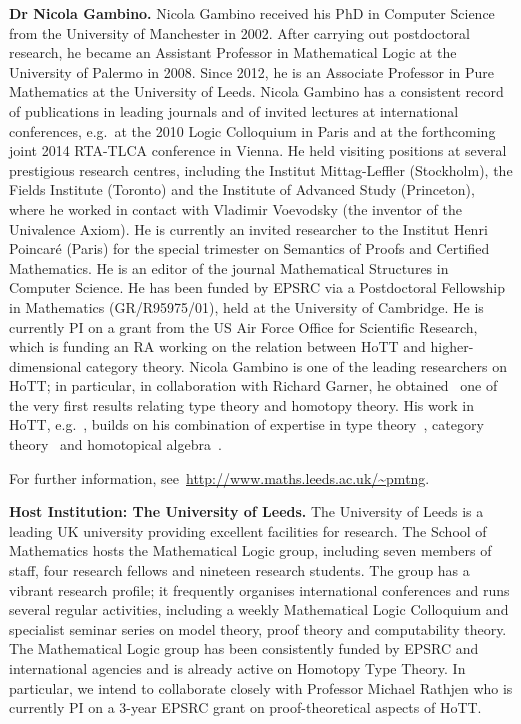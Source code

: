 \documentclass[a4paper,11pt]{article}
\newcommand{\eg}{{e.g.}\ }
\begin{document}
\textbf{Dr Nicola Gambino.} Nicola Gambino received his PhD in
Computer Science from the University of Manchester in 2002. After
carrying out postdoctoral research, he became an Assistant Professor
in Mathematical Logic at the University of Palermo in 2008. Since
 2012, he is an Associate Professor in Pure Mathematics at
the University of Leeds. Nicola Gambino has a consistent record of
publications in leading journals and of invited lectures at
international conferences, {e.g.}~at the 2010 Logic Colloquium in Paris
and at the forthcoming joint 2014 RTA-TLCA conference in Vienna. He
held visiting positions at several prestigious research centres, including the Institut Mittag-Leffler (Stockholm), the
Fields Institute (Toronto) and the Institute of Advanced Study
(Princeton), where he worked in contact with Vladimir Voevodsky (the inventor of 
the Univalence Axiom).  He is currently an invited researcher to the
Institut Henri Poincar\'e (Paris) for the special trimester on
Semantics of Proofs and Certified Mathematics.  He is an editor of the
journal Mathematical Structures in Computer Science. He has been funded by 
EPSRC via a Postdoctoral Fellowship in Mathematics (GR/R95975/01), held at the University of Cambridge. He is currently PI on a grant from 
the US Air Force Office for Scientific
Research, which is funding an RA working on the relation between HoTT and
higher-dimensional category theory. 
Nicola Gambino is one of the leading researchers on HoTT; in particular, in collaboration with Richard Garner, he obtained~\cite{gambinoGarner:ITwfs} one of the 
very first results relating type theory and homotopy theory. His work in HoTT, \eg \cite{awodeyGamSoja:indTypesInHTT}, builds on his combination of expertise in type theory~\cite{GambinoN:gentti}, category 
theory~\cite{gambinoHyland:welfoundedTrees,GambinoN:polfpm} and homotopical algebra~\cite{GambinoN:homl2c,GambinoN:weilsh}.





For further information,  see~\url{http://www.maths.leeds.ac.uk/~pmtng}.

\textbf{Host Institution: The University of Leeds.} The University of
Leeds is a leading UK university providing
excellent facilities for research. The School of Mathematics hosts the
Mathematical Logic group, including seven members of staff, four
research fellows and nineteen research students. The group has a
vibrant research profile; it frequently organises
international conferences and runs several regular activities,
including a weekly Mathematical Logic Colloquium and specialist
seminar series on model theory, proof theory and computability
theory. The Mathematical Logic group has been consistently funded by
EPSRC and international agencies and is already active on Homotopy
Type Theory. In particular, we intend to collaborate closely with
Professor Michael Rathjen who is currently PI
on a 3-year EPSRC grant on proof-theoretical aspects of HoTT. 
\end{document}
